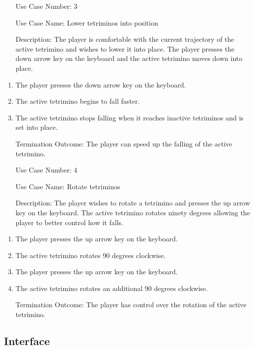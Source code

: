 \documentclass[10pt,conference,onecolumn,compsoc]{IEEEtran}
\begin{document}
\begin{itemize}
\item[Use Case Number:] 3
\item[Use Case Name:] Lower tetriminos into position
\item[Description:] The player is comfortable with the current trajectory of the active tetrimino and wishes to lower it into place. The player presses the down arrow key on the keyboard and the active tetrimino moves down into place.
\end{itemize}
\begin{enumerate}
\item The player presses the down arrow key on the keyboard.
\item The active tetrimino begins to fall faster.
\item The active tetrimino stops falling when it reaches inactive tetriminos and is set into place.
\item[Termination Outcome:] The player can speed up the falling of the active tetrimino.
\end{enumerate}
\medskip
 
\begin{itemize}
\item[Use Case Number:] 4
\item[Use Case Name:] Rotate tetriminos
\item[Description:] The player wishes to rotate a tetrimino and presses the up arrow key on the keyboard. The active tetrimino rotates ninety degrees allowing the player to better control how it falls.
\end{itemize}
\begin{enumerate}
\item The player presses the up arrow key on the keyboard.
\item The active tetrimino rotates 90 degrees clockwise.
\item The player presses the up arrow key on the keyboard.
\item The active tetrimino rotates an additional 90 degrees clockwise.
\item[Termination Outcome:] The player has control over the rotation of the active tetrimino.
\end{enumerate}
\medskip

\subsection{Interface}
\end{document}
